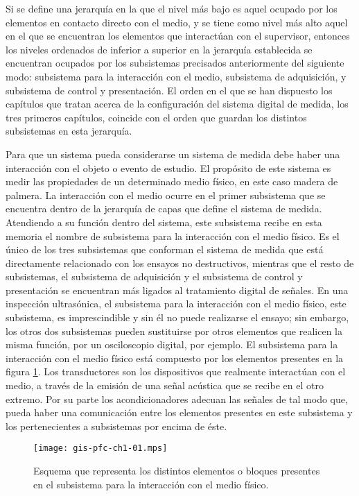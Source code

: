 Si se define una jerarquía en la que el nivel más bajo es aquel ocupado por
los elementos en contacto directo con el medio, y se tiene como nivel más
alto aquel en el que se encuentran los elementos que interactúan con el
supervisor, entonces los niveles ordenados de inferior a superior en la
jerarquía establecida se encuentran ocupados por los subsistemas precisados
anteriormente del siguiente modo: subsistema para la interacción con el
medio, subsistema de adquisición, y subsistema de control y presentación.
El orden en el que se han dispuesto los capítulos que tratan acerca de la
configuración del sistema digital de medida, los tres primeros capítulos,
coincide con el orden que guardan los distintos subsistemas en esta
jerarquía.



Para que un sistema pueda considerarse un sistema de medida debe haber una
interacción con el objeto o evento de estudio. El propósito de este sistema
es medir las propiedades de un determinado medio físico, en este caso
madera de palmera. La interacción con el medio ocurre en el primer
subsistema que se encuentra dentro de la jerarquía de capas que define el
sistema de medida. Atendiendo a su función dentro del sistema, este
subsistema recibe en esta memoria el nombre de subsistema para la
interacción con el medio físico. Es el único de los tres subsistemas que
conforman el sistema de medida que está directamente relacionado con los
ensayos no destructivos, mientras que el resto de subsistemas, el
subsistema de adquisición y el subsistema de control y presentación se
encuentran más ligados al tratamiento digital de señales. En una inspección
ultrasónica, el subsistema para la interacción con el medio físico, este
subsistema, es imprescindible y sin él no puede realizarse el ensayo; sin
embargo, los otros dos subsistemas pueden sustituirse por otros elementos
que realicen la misma función, por un osciloscopio digital, por ejemplo. El
subsistema para la interacción con el medio físico está compuesto por los
elementos presentes en la figura \cref{fig:submedium}. Los transductores
son los dispositivos que realmente interactúan con el medio, a través de la
emisión de una señal acústica que se recibe en el otro extremo. Por su
parte los acondicionadores adecuan las señales de tal modo que, pueda haber
una comunicación entre los elementos presentes en este subsistema y los
pertenecientes a subsistemas por encima de éste.

\begin{figure}
	\begin{center}
		\texttt{[image: gis-pfc-ch1-01.mps]}
	\end{center}
	\caption[Subsistema para la interacción del medio físico]{Esquema
	que representa los distintos elementos o bloques presentes en el
	subsistema para la interacción con el medio físico.}
	\label{fig:submedium}
\end{figure}

